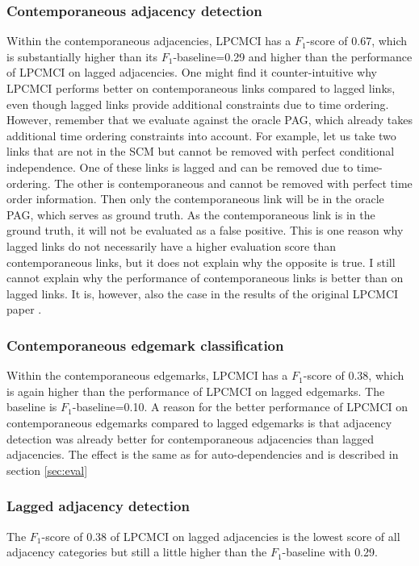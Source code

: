 \documentclass[conference]{IEEEtran}
\begin{document}
\subsubsection{Contemporaneous adjacency detection}
Within the contemporaneous adjacencies, LPCMCI has a $F_1$-score of 0.67, which is substantially higher than its $F_1$-baseline=0.29 and higher than the performance of LPCMCI on lagged adjacencies.
One might find it counter-intuitive why LPCMCI performs better on contemporaneous links compared to lagged links, even though lagged links provide additional constraints due to time ordering. However, remember that we evaluate against the oracle PAG, which already takes additional time ordering constraints into account. For example, let us take two links that are not in the SCM but cannot be removed with perfect conditional independence. One of these links is lagged and can be removed due to time-ordering. The other is contemporaneous and cannot be removed with perfect time order information. Then only the contemporaneous link will be in the oracle PAG, which serves as ground truth. As the contemporaneous link is in the ground truth, it will not be evaluated as a false positive. This is one reason why lagged links do not necessarily have a higher evaluation score than contemporaneous links, but it does not explain why the opposite is true.
I still cannot explain why the performance of contemporaneous links is better than on lagged links.
It is, however, also the case in the results of the original LPCMCI paper \cite{gerhardus_high-recall_2021}.

\subsubsection{Contemporaneous edgemark classification}
Within the contemporaneous edgemarks, LPCMCI has a $F_1$-score of 0.38, which is again higher than the performance of LPCMCI on lagged edgemarks. The baseline is $F_1$-baseline=0.10.
A reason for the better performance of LPCMCI on contemporaneous edgemarks compared to lagged edgemarks is that adjacency detection was already better for contemporaneous adjacencies than lagged adjacencies. The effect is the same as for auto-dependencies and is described in section \ref{sec:eval}

\subsubsection{Lagged adjacency detection}
The $F_1$-score of 0.38 of LPCMCI on lagged adjacencies is the lowest score of all adjacency categories but still a little higher than the $F_1$-baseline with 0.29.
\end{document}
